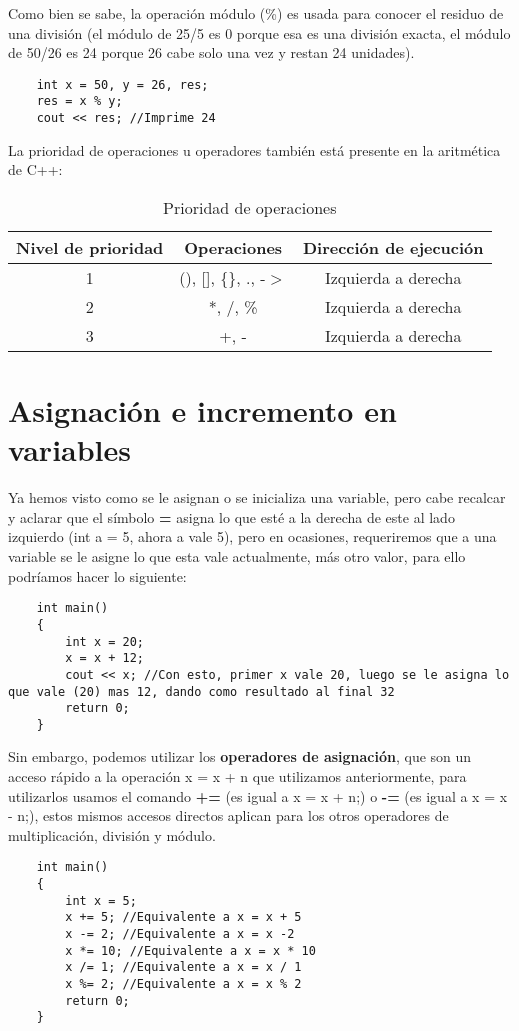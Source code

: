 Como bien se sabe, la operación módulo (\%) es usada para conocer el residuo de una división (el módulo de 25/5 es 0 porque esa es una división exacta, el módulo de 50/26 es 24 porque 26 cabe solo una vez y restan 24 unidades).
\begin{lstlisting}
    int x = 50, y = 26, res;
    res = x % y;
    cout << res; //Imprime 24
\end{lstlisting}

La prioridad de operaciones u operadores también está presente en la aritmética de C++:
\begin{table}[H]
    \begin{center}
        \caption{Prioridad de operaciones}
        \label{tab: 2}
        \begin{tabular}{c c c}
            \hline
            \textbf{Nivel de prioridad}&\textbf{Operaciones}&\textbf{Dirección de ejecución} \\
            \hline
            1   & (), [], \{\}, ., -$>$ & Izquierda a derecha \\
            2   & *, /, \%              & Izquierda a derecha \\
            3   & +, -                  & Izquierda a derecha \\
            \hline
        \end{tabular}
    \end{center}
\end{table}



\section{Asignación e incremento en variables}
\hspace{0.55cm}Ya hemos visto como se le asignan o se inicializa una variable, pero cabe recalcar y aclarar que el símbolo \textbf{=} asigna lo que esté a la derecha de este al lado izquierdo (int a = 5, ahora a vale 5), pero en ocasiones, requeriremos que a una variable se le asigne lo que esta vale actualmente, más otro valor, para ello podríamos hacer lo siguiente:
\begin{lstlisting}
    int main()
    {
        int x = 20;
        x = x + 12;
        cout << x; //Con esto, primer x vale 20, luego se le asigna lo que vale (20) mas 12, dando como resultado al final 32
        return 0;
    }
\end{lstlisting}

Sin embargo, podemos utilizar los \textbf{operadores de asignación}, que son un acceso rápido a la operación x = x + n que utilizamos anteriormente, para utilizarlos usamos el comando \textbf{+=} (es igual a x = x + n;) o \textbf{-=} (es igual a x = x - n;), estos mismos accesos directos aplican para los otros operadores de multiplicación, división y módulo.
\begin{lstlisting}
    int main()
    {
        int x = 5;
        x += 5; //Equivalente a x = x + 5
        x -= 2; //Equivalente a x = x -2
        x *= 10; //Equivalente a x = x * 10
        x /= 1; //Equivalente a x = x / 1
        x %= 2; //Equivalente a x = x % 2
        return 0;
    }
\end{lstlisting}

